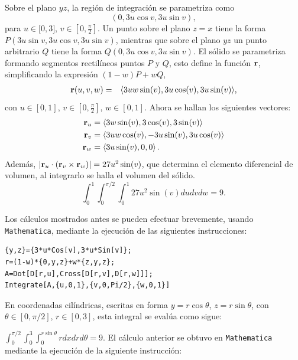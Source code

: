 Sobre el plano $yz$, la región de integración se parametriza como
\[(0,3u\cos v,3u\sin v),\] para $u\in \lbrack 0,3]$, $v\in [0,\frac{\pi}{2}]$. Un punto sobre el plano $z=x$ tiene la forma
$P(3u\sin v,3u\cos v,3u\sin v) $, mientras que sobre el plano $yz$ un punto arbitrario $Q$ tiene la forma $Q(0,3u\cos v,3u\sin v) $.
El sólido se parametriza formando segmentos rectilíneos puntos $P$ y $Q$,
esto define la función ${\bf r}$, simplificando la expresión $(1-w)P + wQ$,
\begin{eqnarray*}
{\bf r}(u,v,w) &=&\langle3 u w \sin (v),3 u \cos (v),3 u \sin (v)\rangle,
\end{eqnarray*}
con $u\in [0,1]$, $v\in [ 0,\frac{\pi }{2}]$, $w\in [0,1]$. Ahora se hallan los siguientes vectores:
\begin{align*}
{\bf r}_{u}&=\left\langle 3 w \sin (v),3 \cos (v),3 \sin (v)\right\rangle \\
{\bf r}_{v}&=\left\langle 3 u w \cos (v),-3 u \sin (v),3 u \cos (v) \right\rangle \\
{\bf r}_{w}&=\left\langle 3 u \sin (v),0,0 \right\rangle .
\end{align*}
Además, $\left| {\bf r}_{u}\cdot \left( {\bf r}_{v}\times {\bf r}_{w}\right) \right| = 27u^{2}\sin(v)$, que determina el elemento diferencial de volumen, al integrarlo se halla el volumen del sólido.
\[\int_{0}^{1}\int_{0}^{\pi /2}\int_{0}^{1} 27u^{2}\sin(v) dudvdw=9.\]

Los cálculos mostrados antes se pueden efectuar brevemente, usando \verb"Mathematica",
mediante la ejecución de las siguientes instrucciones:

\begin{tcolorbox}[title=\bf Instrucción en \verb"Mathematica"]\begin{Verbatim}[formatcom=\letraverbatim]
{y,z}={3*u*Cos[v],3*u*Sin[v]};
r=(1-w)*{0,y,z}+w*{z,y,z};
A=Dot[D[r,u],Cross[D[r,v],D[r,w]]];
Integrate[A,{u,0,1},{v,0,Pi/2},{w,0,1}]
\end{Verbatim}
\end{tcolorbox}

En coordenadas cilíndricas, escritas en  forma
$y=r \cos \theta$, $z=r \sin \theta$, con $\theta \in[0,\pi/2]$, $r \in [0,3]$,
esta integral se evalúa como sigue:

$\int_0^{\pi/2} \int_0^3 \int_0^{r\sin\theta} r dxdr d\theta =9$.
El cálculo anterior se obtuvo en \verb"Mathematica" mediante la ejecución de la siguiente instrucción:

